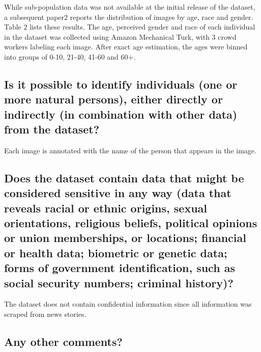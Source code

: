 \noindent While sub-population data was not available at the initial release of the dataset, a subsequent paper2 reports the distribution of images by age, race and gender. Table 2 lists these results. The age, perceived gender and race of each individual in the dataset was collected using Amazon Mechanical Turk, with 3 crowd workers labeling each image. After exact age estimation, the ages were binned into groups of 0-10, 21-40, 41-60 and 60+. 

\subsection*{Is it possible to identify individuals (\ie one or more natural persons), either directly or indirectly (\ie in combination with other data) from the dataset?}
\noindent Each image is annotated with the name of the person that appears
in the image.

\subsection*{Does the dataset contain data that might be considered sensitive in any way (\eg data that reveals racial or ethnic origins, sexual orientations, religious beliefs, political opinions or union memberships, or locations; financial or health data; biometric or genetic data; forms of government identification, such as social security numbers; criminal history)?}
\noindent The dataset does not contain confidential information since all information was scraped from news stories. 

\subsection*{Any other comments?}
